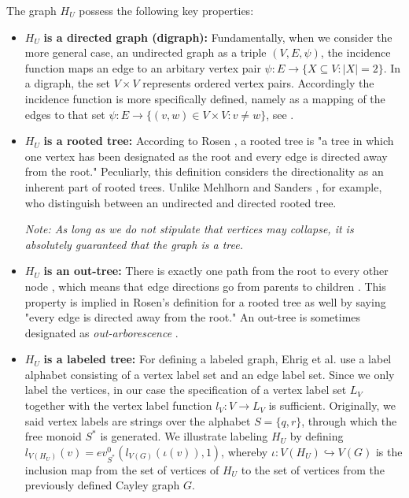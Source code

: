 \pagebreak
\begin{definition}
The graph $H_U$ possess the following key properties:
\begin{itemize}
	\item \mbox{\boldmath$H_U$} \textbf{is a directed graph (digraph):} Fundamentally, when we consider the more general case, an undirected graph as a triple $(V,E,\psi)$, the incidence function maps an edge to an arbitary vertex pair $\psi : E\rightarrow\{X\subseteq V:\left|X\right|=2\}$. In a digraph, the set $V\times V$ represents ordered vertex pairs. Accordingly the incidence function is more specifically defined, namely as a mapping of the edges to that set $\psi : E\rightarrow\{(v,w)\in V\times V:v\neq w\}$, see \cite[p.~15]{Ref_Korte_Vygen}.
	\item \mbox{\boldmath$H_U$} \textbf{is a rooted tree:} According to Rosen \cite[p.~747]{Ref_Rosen}, a rooted tree is "a tree in which one vertex has been designated as the root and every edge is directed away from the root." Peculiarly, this definition considers the directionality as an inherent part of rooted trees. Unlike Mehlhorn and Sanders \cite[p.~52]{Ref_Mehlhorn_Sanders}, for example, who distinguish between an undirected and directed rooted tree.
	\par\smallskip
	\textit{Note: As long as we do not stipulate that vertices may collapse, it is absolutely guaranteed that the graph is a tree.}
	\item \mbox{\boldmath$H_U$} \textbf{is an out-tree:} There is exactly one	path from the root to every other node \cite[p.~52]{Ref_Mehlhorn_Sanders}, which means that edge directions go from parents to children \cite[p.~108]{Ref_Du_Ko_Hu}. This property is implied in Rosen's definition for a rooted tree as well by saying "every edge is directed away from the root." An out-tree is sometimes designated as \textit{out-arborescence} \cite[p.~108]{Ref_Du_Ko_Hu}.
	\item \mbox{\boldmath$H_U$} \textbf{is a labeled tree:} For defining a labeled graph, Ehrig et al. \cite[p.~23]{Ref_Ehrig_etal} use a label alphabet consisting of a vertex label set and an edge label set. Since we only label the vertices, in our case the specification of a vertex label set $L_V$ together with the vertex label function $l_V:V\rightarrow L_V$ is sufficient. Originally, we said vertex labels are strings over the alphabet $S=\{q,r\}$, through which the free monoid $S^*$ is generated. We illustrate labeling $H_U$ by defining $l_{V(H_U)}(v)=ev^0_{S^*}(l_{V(G)}(\iota(v)),1)$, whereby $\iota:V(H_U)\hookrightarrow V(G)$ is the inclusion map \cite[p.~142]{Ref_Childs} from the set of vertices of $H_U$ to the set of vertices from the previously defined Cayley graph $G$.
\end{itemize}
\label{def:H_U}
\end{definition}

